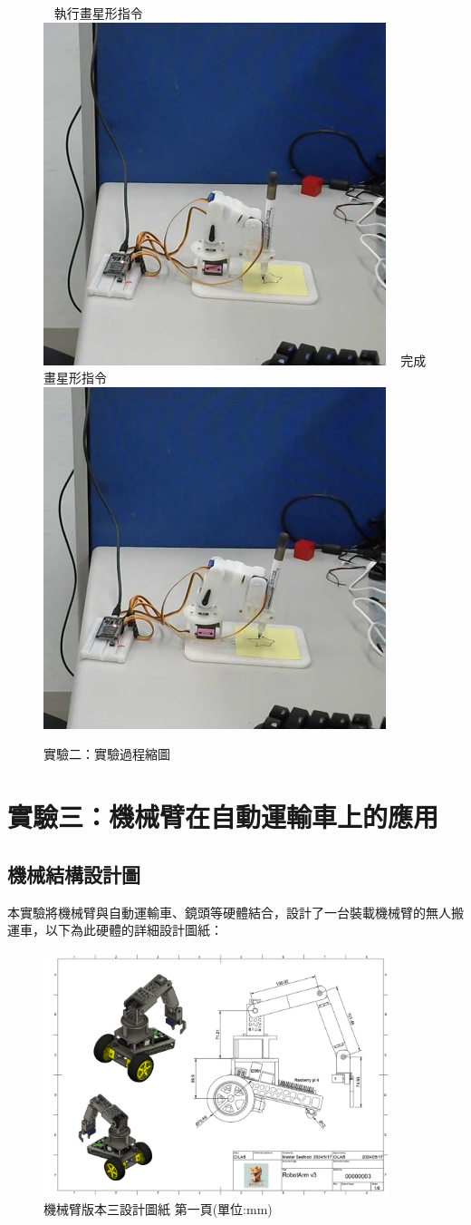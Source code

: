 \documentclass[class=NCU_thesis, crop=false]{standalone}
\begin{document}
\begin{figure}[h]
    ~    
    \subcaptionbox
        {執行畫星形指令
        \label{fig:fig-dataset-contrast-after-adjustment}}
        {\includegraphics[width=0.4\linewidth]{figures/star_0.jpg}}
    ~
    \subcaptionbox
        {完成畫星形指令
        \label{fig:fig-dataset-contrast-after-adjustment}}
        {\includegraphics[width=0.4\linewidth]{figures/star_1.jpg}}   
\caption{實驗二：實驗過程縮圖}
\end{figure}

\section{實驗三：機械臂在自動運輸車上的應用}
\subsection{機械結構設計圖}
本實驗將機械臂與自動運輸車、鏡頭等硬體結合，設計了一台裝載機械臂的無人搬運車，以下為此硬體的詳細設計圖紙：
\begin{figure}[htbp]
    \centering
    \includegraphics[width=0.9\textwidth]{figures/Armv3 (1).PNG}
    \caption{機械臂版本三設計圖紙 第一頁(單位:mm)}
\end{figure}
\end{document}

